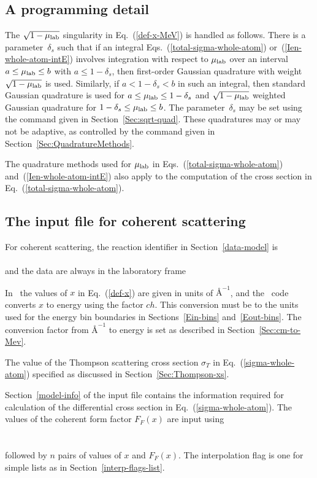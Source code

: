 \subsection{A programming detail}\label{Sec:coherent-quad}
The $\sqrt{1 - \mu_{\text{lab}}}$ singularity in Eq.~(\ref{def-x-MeV})
is handled as follows.  There is a parameter~$\delta_s$ 
such that if an integral Eqs.~(\ref{total-sigma-whole-atom}) 
or~(\ref{Ien-whole-atom-intE}) involves integration with
respect to $\mu_{\text{lab}}$ over an interval $a \le \mu_{\text{lab}} \le b$
with $a \le 1 - \delta_s$, then first-order Gaussian
quadrature with weight  $\sqrt{1 - \mu_{\text{lab}}}$ is used.  Similarly,
if $a < 1 - \delta_s < b$ in such an integral, then standard
Gaussian quadrature is used for  $a \le \mu_{\text{lab}} \le 1 - \delta_s$
and $\sqrt{1 - \mu_{\text{lab}}}$ weighted Gaussian quadrature for
$1 - \delta_s \le \mu_{\text{lab}} \le b$.  The parameter~$ \delta_s$
may be set using the command given in Section~\ref{Sec:sqrt-quad}.
These quadratures may or may not be adaptive, as controlled by
the command given in Section~\ref{Sec:QuadratureMethods}.

The quadrature methods used for $\mu_{\text{lab}}$ in
Eqs.~(\ref{total-sigma-whole-atom}) 
and~(\ref{Ien-whole-atom-intE})
also apply to the computation of
the cross section in Eq.~(\ref{total-sigma-whole-atom}).

\subsection{The input file for coherent scattering}
For coherent scattering, the reaction identifier in Section~\ref{data-model} 
is\\
  \\
and the data are always in the laboratory frame\\

In \xendl\ the values of $x$ in Eq.~(\ref{def-x}) are given in units of
$\text{\AA}^{-1}$, and the \gettransfer\ code converts $x$ to energy using
the factor $ch$.  This conversion must be to the units used for the
energy bin boundaries in Sections~\ref{Ein-bins} and~\ref{Eout-bins}.
The conversion factor from $\text{\AA}^{-1}$
to energy is set as described in 
Section~\ref{Sec:cm-to-Mev}.

The value of the Thompson scattering cross section $\sigma_T$ in
Eq.~(\ref{sigma-whole-atom}) specified as discussed in
Section~\ref{Sec:Thompson-xs}.

Section~\ref{model-info} of the input file contains the information required
for calculation of the differential cross section in Eq.~(\ref{sigma-whole-atom}).
The values of the coherent form factor $F_F(x)$ are
input using\\
    \\
    \\
followed by $n$ pairs of values of $x$ and $F_F(x)$.  The interpolation
flag is one for simple lists as in Section~\ref{interp-flags-list}.

